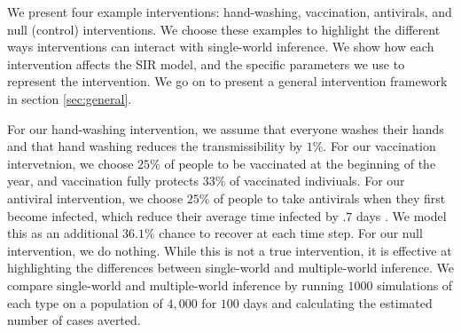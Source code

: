 \documentclass[openacc]{rsproca_new}%
\begin{document}
% 

We present four example interventions: hand-washing, vaccination, antivirals, and null (control) interventions.
We choose these examples to highlight the different ways interventions can interact with single-world inference.
We show how each intervention affects the SIR model, and the specific parameters we use to represent the intervention.
We go on to present a general intervention framework in section \ref{sec:general}.

For our hand-washing intervention, we assume that everyone washes their hands and that hand washing reduces the transmissibility by $1\%$.
For our vaccination intervetnion, we choose $25\%$ of people to be vaccinated at the beginning of the year, and vaccination fully protects $33\%$ of vaccinated indiviuals.
For our antiviral intervention, we choose $25\%$ of people to take antivirals when they first become infected, which reduce their average time infected by $.7$ days \cite{}.
We model this as an additional $36.1\%$ chance to recover at each time step.
For our null intervention, we do nothing.
While this is not a true intervention, it is effective at highlighting the differences between single-world and multiple-world inference.
We compare single-world and multiple-world inference by running $1000$ simulations of each type on a population of $4,000$ for $100$ days and calculating the estimated number of cases averted.
\end{document}
